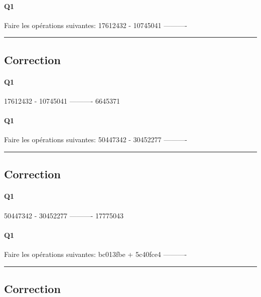 \paragraph{Q1}

Faire les opérations suivantes: 
  17612432
- 10745041
----------



\hrule width 1\linewidth
\pagebreak

\subsection{Correction}


\paragraph{Q1}

  17612432
- 10745041
----------
   6645371

\pagebreak

\paragraph{Q1}

Faire les opérations suivantes: 
  50447342
- 30452277
----------



\hrule width 1\linewidth
\pagebreak

\subsection{Correction}


\paragraph{Q1}

  50447342
- 30452277
----------
  17775043

\pagebreak

\paragraph{Q1}

Faire les opérations suivantes: 
  bc013fbe
+ 5c40fce4
----------



\hrule width 1\linewidth
\pagebreak

\subsection{Correction}


